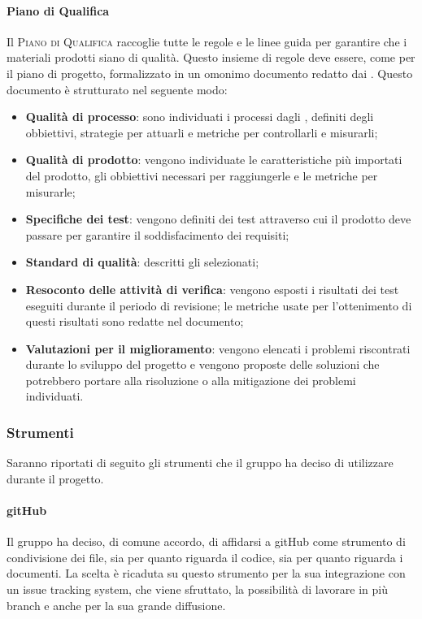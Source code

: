 \documentclass[../norme-di-progetto.tex]{subfiles}
\begin{document}
\paragraph{Piano di Qualifica}
Il \textsc{Piano di Qualifica} raccoglie tutte le regole e le linee guida per garantire che i materiali prodotti siano di qualità. Questo insieme di regole deve essere, come per il piano di progetto, formalizzato in un omonimo documento redatto dai .
Questo documento è strutturato nel seguente modo:
\begin{itemize}
    \item \textbf{Qualità di processo}: sono individuati i processi dagli , definiti degli obbiettivi, strategie per attuarli e metriche per controllarli e misurarli;
    \item \textbf{Qualità di prodotto}: vengono individuate le caratteristiche più importati del prodotto, gli obbiettivi necessari per raggiungerle e le metriche per misurarle;
    \item \textbf{Specifiche dei test}: vengono definiti dei test attraverso cui il prodotto deve passare per garantire il soddisfacimento dei requisiti;
    \item \textbf{Standard di qualità}: descritti gli  selezionati;
    \item \textbf{Resoconto delle attività di verifica}: vengono esposti i risultati dei test eseguiti durante il periodo di revisione; le metriche usate per l'ottenimento di questi risultati sono redatte nel documento;
    \item \textbf{Valutazioni per il miglioramento}: vengono elencati i problemi riscontrati durante lo sviluppo del progetto e vengono proposte delle soluzioni che potrebbero portare alla risoluzione o alla mitigazione dei problemi individuati.
\end{itemize} 

\subsubsection{Strumenti}
Saranno riportati di seguito gli strumenti che il gruppo ha deciso di utilizzare durante il progetto.

\paragraph{gitHub}
Il gruppo ha deciso, di comune accordo, di affidarsi a gitHub come strumento di condivisione dei file, sia per quanto riguarda il codice, sia per quanto riguarda i documenti. La scelta è ricaduta su questo strumento per la sua integrazione con un issue tracking system, che viene sfruttato, la possibilità di lavorare in più branch e anche per la sua grande diffusione.
\end{document}
